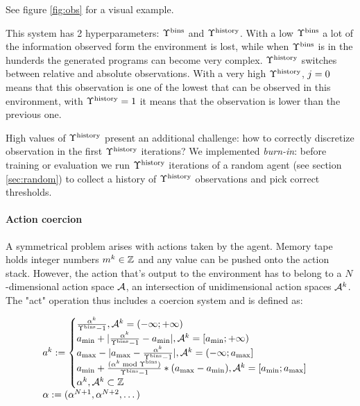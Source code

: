 See figure \ref{fig:obs} for a visual example.


This system has 2 hyperparameters: $\Upsilon^\text{bins}$ and $\Upsilon^\text{history}$.
With a low $\Upsilon^\text{bins}$ a lot of the information observed form the environment is lost, while when $\Upsilon^\text{bins}$ is in the hunderds the generated programs can become very complex.
$\Upsilon^\text{history}$ switches between relative and absolute observations.
With a very high $\Upsilon^\text{history}$, $j=0$ means that this observation is one of the lowest that can be observed in this environment, with $\Upsilon^\text{history}=1$ it means that the observation is lower than the previous one.

High values of $\Upsilon^\text{history}$ present an additional challenge: how to correctly discretize observation in the first $\Upsilon^\text{history}$ iterations?
We implemented \textit{burn-in}: before training or evaluation we run $\Upsilon^\text{history}$ iterations of a random agent (see section \ref{sec:random}) to collect a history of $\Upsilon^\text{history}$ observations and pick correct thresholds.

\paragraph{Action coercion}
\label{sec:act}

A symmetrical problem arises with actions taken by the agent. 
Memory tape holds integer numbers $m^k \in \mathbb{Z}$ and any value can be pushed onto the action stack.
However, the action that's output to the environment has to belong to a $N$-dimensional action space $\mathcal{A}$, an intersection of unidimensional action spaces $\mathcal{A}^k$.
The "act" operation thus includes a coercion system and is defined as:

\begin{equation}
\label{eq:act}
\begin{array}{l}
    a^k := \begin{cases}
\frac{\alpha^k}{\Upsilon^\text{bins}-1}, \mathcal{A}^k = (- \infty; + \infty) \\
a_{\text{min}} + |\frac{\alpha^k}{\Upsilon^\text{bins}-1} - a_{\text{min}}|, \mathcal{A}^k = [a_{\text{min}}; + \infty) \\
a_{\text{max}} - |a_{\text{max}} - \frac{\alpha^k}{\Upsilon^\text{bins}-1}|, \mathcal{A}^k = (- \infty; a_{\text{max}}] \\
a_{\text{min}} + \frac{(\alpha^k \bmod \Upsilon^\text{bins})}{\Upsilon^\text{bins} - 1} * (a_{\text{max}} - a_{\text{min}}), \mathcal{A}^k = [a_{\text{min}}; a_{\text{max}}] \\
\alpha^k, \mathcal{A}^k \subset \mathbb{Z}
\end{cases} \\
    \alpha := (\alpha^{N+1}, \alpha^{N+2}, \dots)
\end{array}
\end{equation}


